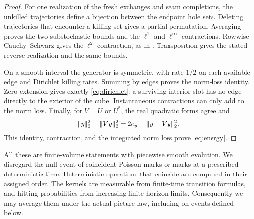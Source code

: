 \begin{proof}
For one realization of the fresh exchanges and seam completions, the
unkilled trajectories define a bijection between the endpoint hole sets.
Deleting trajectories that encounter a killing set gives a partial
permutation.  Averaging proves the two substochastic bounds and the
$\ell^1$ and $\ell^\infty$ contractions.  Rowwise Cauchy--Schwarz gives
the $\ell^2$ contraction, as in
\cite[Section~3.1]{BlochLaw}.  Transposition gives the stated reverse
realization and the same bounds.

On a smooth interval the generator is symmetric, with rate $1/2$ on
each available edge and Dirichlet killing rates.  Summing by edges proves
the norm-loss identity.  Zero extension gives exactly
\eqref{eq:dirichlet}: a surviving interior slot has no edge directly to
the exterior of the cube.  Instantaneous contractions can only add to
the norm loss.  Finally, for $V=U$ or $U^*$, the real quadratic forms
agree and
\[
 \lVert y\rVert_2^2-\lVert Vy\rVert_2^2
       =2e_y-\lVert y-Vy\rVert_2^2.
\]
This identity, contraction, and the integrated norm loss prove
\eqref{eq:energy}.
\end{proof}

All these are finite-volume statements with piecewise smooth evolution.
We disregard the null event of coincident Poisson marks or marks at a
prescribed deterministic time.  Deterministic operations that coincide
are composed in their assigned order.  The kernels are measurable from
finite-time transition formulas, and hitting probabilities from
increasing finite-horizon limits.  Consequently we may average them
under the actual picture law, including on events defined below.
